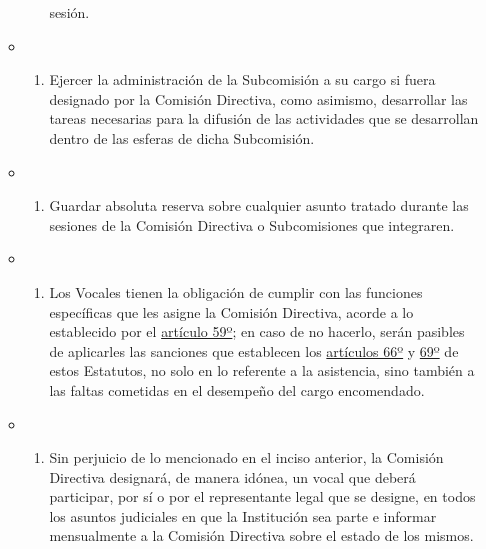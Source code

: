 \documentclass[]{book}
\providecommand{\tightlist}{%
  \setlength{\itemsep}{0pt}\setlength{\parskip}{0pt}}
\begin{document}
\begin{itemize}
\begin{itemize}
\begin{enumerate}
      sesión.
    \end{enumerate}
  \item
    \begin{enumerate}
    \def\labelenumi{\alph{enumi})}
    \setcounter{enumi}{5}
    \tightlist
    \item
      Ejercer la administración de la Subcomisión a su cargo si fuera
      designado por la Comisión Directiva, como asimismo, desarrollar
      las tareas necesarias para la difusión de las actividades que se
      desarrollan dentro de las esferas de dicha Subcomisión.
    \end{enumerate}
  \item
    \begin{enumerate}
    \def\labelenumi{\alph{enumi})}
    \setcounter{enumi}{6}
    \tightlist
    \item
      Guardar absoluta reserva sobre cualquier asunto tratado durante
      las sesiones de la Comisión Directiva o Subcomisiones que
      integraren.
    \end{enumerate}
  \item
    \begin{enumerate}
    \def\labelenumi{\alph{enumi})}
    \setcounter{enumi}{7}
    \tightlist
    \item
      Los Vocales tienen la obligación de cumplir con las funciones
      específicas que les asigne la Comisión Directiva, acorde a lo
      establecido por el \protect\hyperlink{art59}{artículo 59º}; en
      caso de no hacerlo, serán pasibles de aplicarles las sanciones que
      establecen los \protect\hyperlink{art66}{artículos 66º} y
      \protect\hyperlink{art69}{69º} de estos Estatutos, no solo en lo
      referente a la asistencia, sino también a las faltas cometidas en
      el desempeño del cargo encomendado.
    \end{enumerate}
  \item
    \begin{enumerate}
    \def\labelenumi{\roman{enumi})}
    \tightlist
    \item
      Sin perjuicio de lo mencionado en el inciso anterior, la Comisión
      Directiva designará, de manera idónea, un vocal que deberá
      participar, por sí o por el representante legal que se designe, en
      todos los asuntos judiciales en que la Institución sea parte e
      informar mensualmente a la Comisión Directiva sobre el estado de
      los mismos.
    \end{enumerate}
  \end{itemize}
\end{itemize}
\end{document}
